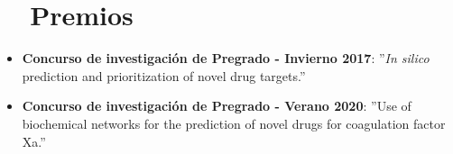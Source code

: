 \documentclass[letter,20pt]{article}
\newcommand{\resumeItem}[2]{
  \item\small{
    \textbf{#1}{: #2 \vspace{-2pt}}
  }
}
\newcommand{\resumeItemWithoutTitle}[1]{
  \item\small{
    {\vspace{-2pt}}
  }
}
\newcommand{\resumeSubItem}[2]{\resumeItem{#1}{#2}\vspace{-3pt}}
\newcommand{\resumeSubHeadingListStart}{\begin{itemize}[leftmargin=*]}
\newcommand{\resumeSubHeadingListEnd}{\end{itemize}}
\begin{document}
\section{~~Premios}
\resumeSubHeadingListStart
\resumeSubItem{Concurso de investigación de Pregrado - Invierno 2017}{''\textit{In silico} prediction and prioritization of novel drug targets.''}
	\resumeSubItem{Concurso de investigación de Pregrado - Verano 2020}{''Use of biochemical networks for the prediction of novel drugs for coagulation factor Xa.''}
\vspace{2pt}
\resumeSubHeadingListEnd
\end{document}
